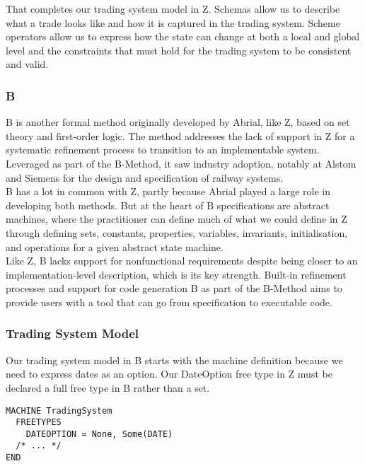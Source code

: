 \documentclass{article}
\begin{document}
\hspace{-0.7cm} That completes our trading system model in Z. Schemas allow us to describe what a trade looks like and how it is captured in the trading system. Scheme operators allow us to express how the state can change at both a local and global level and the constraints that must hold for the trading system to be consistent and valid.

\pagebreak
\subsubsection*{B}

B is another formal method originally developed by Abrial, like Z, based on set theory and first-order logic. The method addresses the lack of support in Z for a systematic refinement process to transition to an implementable system. Leveraged as part of the B-Method, it saw industry adoption, notably at Alstom and Siemens for the design and specification of railway systems. \\
\newline
B has a lot in common with Z, partly because Abrial played a large role in developing both methods. But at the heart of B specifications are abstract machines, where the practitioner can define much of what we could define in Z through defining sets, constants, properties, variables, invariants, initialisation, and operations for a given abstract state machine. \\
\newline
Like Z, B lacks support for nonfunctional requirements despite being closer to an implementation-level description, which is its key strength. Built-in refinement processes and support for code generation B as part of the B-Method aims to provide users with a tool that can go from specification to executable code. 

\subsubsection*{Trading System Model}

Our trading system model in B starts with the machine definition because we need to express dates as an option. Our DateOption free type in Z must be declared a full free type in B rather than a set.

\begin{verbatim}
MACHINE TradingSystem
  FREETYPES
    DATEOPTION = None, Some(DATE)
  /* ... */
END
\end{verbatim}
\end{document}
